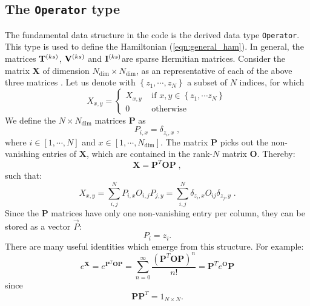 \subsection{The \texttt{Operator} type}\label{sec:op}
The fundamental data structure in the code is the derived data type \texttt{Operator}. This type is used to define the Hamiltonian (\ref{eqn:general_ham}). 
In general, the matrices ${\bf T}^{(ks)}$, ${\bf V}^{(ks)}$  and   ${\bf I}^{(ks)}$are sparse Hermitian matrices.   
Consider the  matrix   ${\bm X}$ of dimension  $N_{\mathrm{dim}} \times N_{\mathrm{dim}}$, as an representative of each of the above three matrices .  Let us  denote  with  $ \left\{z_{1},\cdots,  z_{N}  \right\}$  a subset  of $N$ indices,  
for which
\begin{equation}
X_{x,y}  =
\left\{\begin{matrix}  X_{x,y}  &  \text{ if }   x,  y  \in \left\{ z_1, \cdots z_N \right\}\\ 
                                  0         &  \text{ otherwise } 
      \end{matrix}\right.
\end{equation}
 We define the $N \times N_{\mathrm{dim}}$ matrices $\mathbf{P}$  as
\begin{equation}
P_{i,x}=\delta_{z_{i},x}\;,
\end{equation}
where $i \in [1,\cdots, N ]$ and $ x  \in [1,\cdots, N_{\mathrm{dim}}]$. The matrix  $\bm{P}$ picks out the non-vanishing entries of $\bm{X}$, 
which are contained in the rank-$N$  matrix $\bm{O}$.  Thereby: 
\begin{equation}
\bm{X} =\bm{P}^{T} \bm{O} \bm{P}\;,
\end{equation}
such that:
\begin{equation}
X_{x,y} = \sum\limits_{i,j}^{N}  P_{i,x}  O_{i,j} P_{j,y}=\sum\limits_{i,j}^{N} \delta_{z_{i},x}  O_{ij} \delta_{z_{j},y} \;.
\end{equation}
Since  the  $\bm{P}$ matrices have only one non-vanishing entry per column,  they can be stored as a vector $\vec{P}$:
\begin{equation}
     P_i = z_i.
\end{equation}  
There are  many useful  identities which emerge from this  structure. For example: 
\begin{equation}
	e^{\bm{X}} =  e^{\bm{P}^{T} \bm{O} \bm{P}}   = \sum_{n=0}^{\infty}  \frac{\left( \bm{P}^{T} \bm{O} \bm{P} \right)^n}{n!} =  \bm{P}^{T} e^{ \bm{O} } \bm{P}
\end{equation}
since 
\begin{equation} 
	 \bm{P} \bm{P}^{T}= 1_{N\times N}.
\end{equation}

